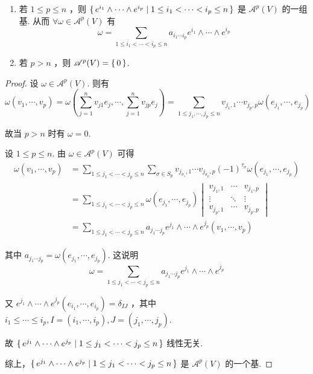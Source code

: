 \begin{property}
    \begin{enumerate}
        \item 若 $1\le p\le n$ ，则 $\set{e^{i_1}\wedge\cdots\wedge e^{i_p}|1\le i_1<\cdots<i_p\le n}$ 是 $\mathscr{A}^p(V)$ 的一组基. 从而 $\forall\omega\in\mathscr{A}^p(V)$ 有
$$
\omega=\sum_{1\le i_1<\cdots<i_p\le n}a_{i_1\cdots i_p}e^{i_1}\wedge\cdots\wedge e^{i_p}
$$

        \item 若 $p>n$ ，则 $\mathscr{A}^p(V)=\set{0}$.
    \end{enumerate}
\end{property}
\begin{proof}
    设 $\omega\in\mathscr{A}^p(V)$. 则有
$$
\omega(v_1,\cdots,v_p)=\omega\left(\sum_{j=1}^nv_{j1}e_j,\cdots,\sum_{j=1}^nv_{jp}e_j\right)=\sum_{1\le j_1,\cdots,j_p\le n}v_{j_1,1}\cdots v_{j_p,p}\omega(e_{j_1},\cdots,e_{j_p})
$$

    故当 $p>n$ 时有 $\omega=0$.
    
    设 $1\le p\le n$. 由 $\omega\in\mathscr{A}^p(V)$ 可得
$$
\begin{aligned}
\omega(v_1,\cdots,v_p)&=\sum_{1\le j_1<\cdots<j_p\le n}\sum_{\sigma\in S_p}v_{j_{\sigma_1},1}\cdots v_{j_{\sigma_p},p}(-1)^{\tau_\sigma}\omega(e_{j_1},\cdots,e_{j_p})\\
&=\sum_{1\le j_1<\cdots<j_p\le n}\omega(e_{j_1},\cdots,e_{j_p})\begin{vmatrix}
    v_{j_1,1} & \cdots & v_{j_1,p}\\
    \vdots & \ddots & \vdots\\
    v_{j_p,1} & \cdots & v_{j_p,p}
\end{vmatrix}\\
&=\sum_{1\le j_1<\cdots<j_p\le n}a_{j_1\cdots j_p}e^{j_1}\wedge\cdots\wedge e^{j_p}(v_1,\cdots,v_p)
\end{aligned}
$$

    其中 $a_{j_1\cdots j_p}=\omega(e_{j_1},\cdots,e_{j_p})$. 这说明
$$
\omega=\sum_{1\le j_1<\cdots<j_p\le n}a_{j_1\cdots j_p}e^{j_1}\wedge\cdots\wedge e^{j_p}
$$

    又 $e^{j_1}\wedge\cdots\wedge e^{j_p}(e_{i_1},\cdots,e_{i_p})=\delta_{IJ}$ ，其中 $i_1\le\cdots\le i_p,I=(i_1,\cdots,i_p),J=(j_1,\cdots,j_p)$.

    故 $\set{e^{j_1}\wedge\cdots\wedge e^{j_p}|1\le j_1<\cdots<j_p\le n}$ 线性无关.

    综上，$\set{e^{j_1}\wedge\cdots\wedge e^{j_p}|1\le j_1<\cdots<j_p\le n}$ 是 $\mathscr{A}^p(V)$ 的一个基.
\end{proof}

